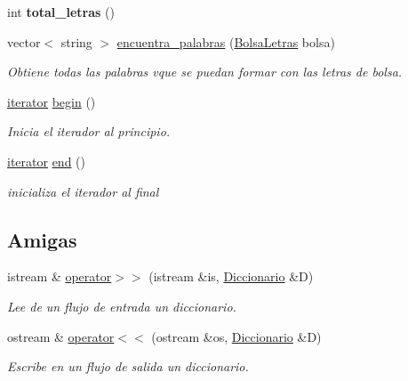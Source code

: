 \begin{DoxyCompactItemize}
\item 
int {\bfseries total\+\_\+letras} ()\hypertarget{class_diccionario_abf36f8c7ad7724da00e7441163719f28}{}\label{class_diccionario_abf36f8c7ad7724da00e7441163719f28}

\item 
vector$<$ string $>$ \hyperlink{class_diccionario_ac55e4c548d7ff8cfcc2a40152d4df4ae}{encuentra\+\_\+palabras} (\hyperlink{class_bolsa_letras}{Bolsa\+Letras} bolsa)
\begin{DoxyCompactList}\small\item\em Obtiene todas las palabras vque se puedan formar con las letras de bolsa. \end{DoxyCompactList}\item 
\hyperlink{class_diccionario_1_1iterator}{iterator} \hyperlink{class_diccionario_a3f42d480e74efbd66b8837d0ea1e491d}{begin} ()\hypertarget{class_diccionario_a3f42d480e74efbd66b8837d0ea1e491d}{}\label{class_diccionario_a3f42d480e74efbd66b8837d0ea1e491d}

\begin{DoxyCompactList}\small\item\em Inicia el iterador al principio. \end{DoxyCompactList}\item 
\hyperlink{class_diccionario_1_1iterator}{iterator} \hyperlink{class_diccionario_abe91cc666c92f7f003507a82bdcd8c35}{end} ()\hypertarget{class_diccionario_abe91cc666c92f7f003507a82bdcd8c35}{}\label{class_diccionario_abe91cc666c92f7f003507a82bdcd8c35}

\begin{DoxyCompactList}\small\item\em inicializa el iterador al final \end{DoxyCompactList}\end{DoxyCompactItemize}
\subsection*{Amigas}
\begin{DoxyCompactItemize}
\item 
istream \& \hyperlink{class_diccionario_a940c6d9371bca891c95a5a044a42905f}{operator$>$$>$} (istream \&is, \hyperlink{class_diccionario}{Diccionario} \&D)
\begin{DoxyCompactList}\small\item\em Lee de un flujo de entrada un diccionario. \end{DoxyCompactList}\item 
ostream \& \hyperlink{class_diccionario_ab113838fe9eefef3cc1c6710e45bde31}{operator$<$$<$} (ostream \&os, \hyperlink{class_diccionario}{Diccionario} \&D)
\begin{DoxyCompactList}\small\item\em Escribe en un flujo de salida un diccionario. \end{DoxyCompactList}\end{DoxyCompactItemize}


